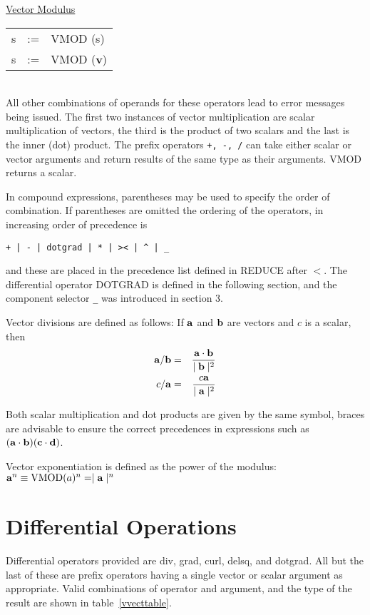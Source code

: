 \underline{Vector Modulus}\\
 
\begin{tabular}{rcl}
   s    &:=& VMOD (s)\\
   s    &:=& VMOD ({\bf v}) \\
\end{tabular} \\

All other combinations of operands for these operators lead to error 
messages being issued.  The first two instances of vector
multiplication are scalar multiplication of vectors, the third is the
 
 
product of two scalars and the last is the inner (dot) product.  The
prefix operators  {\tt +, -, /} can take either scalar or vector
arguments and return results of the same type as their arguments. 
VMOD returns a scalar.

In compound expressions, parentheses may be used to specify the order of
combination.  If parentheses are omitted the ordering of the
operators, in increasing order of precedence is
\begin{verbatim}
+ | - | dotgrad | * | >< | ^ | _
\end{verbatim}
and these are placed in the precedence list defined in REDUCE
after $<$.
The differential operator DOTGRAD is defined in the 
following section, and the component selector {\tt \_} was introduced in
section 3.

Vector divisions are defined as follows:  If ${\bf a}$ and ${\bf b}$ are
vectors and $c$ is a scalar, then
\begin{eqnarray*}
{\bf a} /  {\bf b} & = &  \frac{{\bf a} \cdot {\bf b}}{  \mid {\bf b} 
\mid^2}\\
c / {\bf a}   & = &  \frac{c {\bf a}  }{ \mid {\bf a} \mid^2}
\end{eqnarray*}

Both scalar multiplication and dot products are given by the same symbol, 
braces are advisable to ensure the correct
precedences in expressions such as $({\bf a} \cdot {\bf b}) 
({\bf c} \cdot {\bf d})$.

Vector exponentiation is defined as the power of the modulus:\\
${\bf a}^n \equiv  {\rm VMOD}(a)^n =   \mid {\bf a} \mid^n$

\section{Differential Operations}
Differential operators provided are div, grad, curl, delsq, and dotgrad.
  
 
All but the last of these are prefix operators having a single
vector or scalar argument as appropriate.  Valid combinations of 
operator and argument, and the type of the result are shown in table~\ref{vvecttable}.


